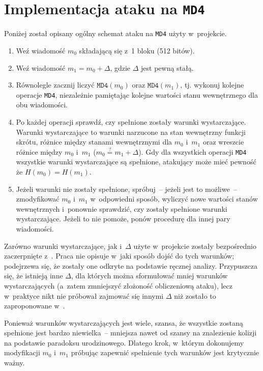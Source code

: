 \documentclass[12pt,a4paper,twoside]{article}
\begin{document}
\section{Implementacja ataku na \texttt{MD4}}

Poniżej został opisany ogólny schemat ataku na \texttt{MD4} użyty w~projekcie.

\begin{enumerate}

\item Weź wiadomość $m_0$ składającą się z~1 bloku (512 bitów).

\item Weź wiadomość $m_1 = m_0 + \Delta$, gdzie $\Delta$ jest pewną stałą.

\item Równolegle zacznij liczyć $\mathtt{MD4}(m_0)$ oraz $\mathtt{MD4}(m_1)$,
tj. wykonuj kolejne operacje \texttt{MD4}, niezależnie pamiętając kolejne
wartości stanu wewnętrznego dla obu wiadomości.

\item Po każdej operacji sprawdź, czy spełnione zostały warunki wystarczające.
Warunki wystarczające to warunki narzucone na stan wewnętrzny funkcji skrótu,
różnice między stanami wewnętrznymi dla $m_0$ i~$m_1$ oraz wreszcie różnice
między $m_0$ i~$m_1$ ($m_0 \stackrel{?}{=} m_1 + \Delta$). Gdy dla wszystkich
operacji \texttt{MD4} wszystkie warunki wystarczające są spełnione, atakujący
może mieć pewność że $H(m_0) = H(m_1)$.

\item Jeżeli warunki nie zostały spełnione, spróbuj~-- jeżeli jest to
możliwe~-- zmodyfikować $m_0$ i~$m_1$ w~odpowiedni sposób, wyliczyć nowe
wartości stanów wewnętrznych i~ponownie sprawdzić, czy zostały spełnione
warunki wystarczające. Jeżeli to nie pomoże, ponów procedurę dla innej pary
wiadomości.

\end{enumerate}

Zarówno warunki wystarczające, jak i~$\Delta$ użyte w~projekcie zostały
bezpośrednio zaczerpnięte z~\cite{wang2005md4}. Praca nie opisuje w~jaki sposób
dojść do tych warunków; podejrzewa się, że zostały one odkryte na podstawie
ręcznej analizy. Przypuszcza się, że istnieją inne $\Delta$, dla których można
sformułować mniej warunków wystarczających (a~zatem zmniejszyć złożoność
obliczeniową ataku), lecz w~praktyce nikt nie próbował zajmować się innymi
$\Delta$ niż zostało to zaproponowane w~\cite{wang2005md4}.

Ponieważ warunków wystarczających jest wiele, szansa, że wszystkie zostaną
spełnione jest bardzo niewielka~-- mniejsza nawet od szansy na znalezienie
kolizji na podstawie paradoksu urodzinowego. Dlatego krok, w~którym dokonujemy
modyfikacji $m_0$ i~$m_1$ próbując zapewnić spełnienie tych warunków jest
krytycznie ważny.
\end{document}
